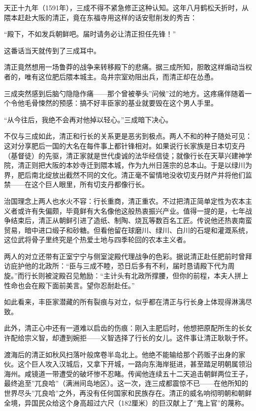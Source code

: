 \documentclass[
]{book}
\begin{document}
天正十九年（1591年），三成不得不紧急修正这种认知。这年八月鹤松夭折时，从隈本赶赴大阪的清正，竟在东福寺用这样的话安慰削发的秀吉：

``殿下，不如发兵朝鲜吧。届时请务必让清正担任先锋！''

这番话当天就传到了三成耳中。

清正竟然想用一场鲁莽的战争来转移殿下的悲痛。据三成所知，胆敢这样煽动当权者的，唯有这位肥后隈本城主。岛井宗室劝阻出兵，而清正却在怂恿。

三成突然感到后脑勺隐隐作痛------那个曾被拳头''问候''过的地方。这疼痛伴随着一个令他毛骨悚然的预感：搞不好丰臣家的基业就要毁在这个男人手里。

``从今往后，我绝不会再对他掉以轻心。''三成暗下决心。

不仅与三成如此，清正和行长的关系更是恶劣到极点。两人不和的种子随处可见：这对分享肥后一国的大名在每件事上都针锋相对。如果说行长家族是日本切支丹（基督徒）的先驱，清正家就是世代虔诚的法华经信徒；就像行长在天草兴建神学院，清正则把大阪的本妙寺迁到隈本城，作为九州日莲宗的总本山。于是以绿川为界，肥后南北绽放出截然不同的文化。清正毫不留情地没收切支丹财产并将他们监禁------在这个巨人眼里，所有切支丹都像行长。

治国理念上两人也水火不容：行长重商，清正重农。不过把清正简单定性为农本主义者或许有失偏颇，毕竟鲜有大名像他这般热衷振兴产业。值得一提的是，七年战争结束后，清正从朝鲜引进了造纸、制陶、烧瓦等数百名工匠。传说他还热衷南蛮贸易，暗中进口缎子和砂糖。但看他留在球磨川、绿川、白川的石堤和灌溉系统，这位武将骨子里终究是个热爱土地与四季轮回的农本主义者。

两人的对立还带有正室宁宁与侧室淀殿代理战争的色彩。据说清正赴任肥前时曾拜访庇护他的北政所：``臣与三成不睦，恐日后多有不利，届时恳请殿下代为周旋。''而行长则被淀殿召见勉励：``主计头有北政所撑腰，但你的前程，本夫人拼上性命也会在殿下面前美言。望你忍耐赴任。''

如此看来，丰臣家潜藏的所有裂痕与对立，似乎都在清正与行长身上体现得淋漓尽致。

此外，清正心中还有一道难以启齿的伤痕：刚入主肥后时，他想把原配所生的长女许配给宗义智，却遭到婉拒------义智选择了行长的女儿。这件事让清正耿耿于怀。

渡海后的清正如秋风扫落叶般席卷半岛北上。他绝不能输给那个药贩子出身的家伙。这个巨人攻入汉城后，又拿下开城，一路向东海岸挺进，甚至踏足明朝属领沿海州。咸镜道一带遭受的破坏惨不忍睹。传闻他连续五十二天追击朝鲜两位王子，最终追至''兀良哈''（满洲间岛地区）。这一次，连三成都震惊不已------在他所知的世界尽头''兀良哈''之外，再没有任何国家和民族存在。清正的威名响彻明朝和朝鲜全境，异国民众给这个身高超过六尺（182厘米）的巨汉献上了''鬼上官''的蔑称。
\end{document}
